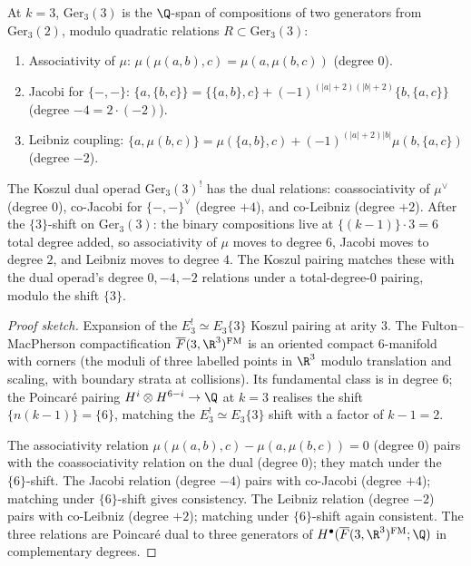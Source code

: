 \begin{proposition}
\label{prop:arity-3-e3-check-cfg2026}
\ClaimStatusProvedHere
At $k = 3$, $\mathrm{Ger}_3(3)$ is the $\Q$-span of compositions of two
generators from $\mathrm{Ger}_3(2)$, modulo quadratic relations
$R \subset \mathrm{Ger}_3(3)$:
\begin{enumerate}[label=\textup{(R\arabic*)}]
  \item Associativity of $\mu$: $\mu(\mu(a, b), c) = \mu(a, \mu(b, c))$
        (degree $0$).
  \item Jacobi for $\{-, -\}$:
        $\{a, \{b, c\}\} = \{\{a, b\}, c\} + (-1)^{(|a| + 2)(|b| + 2)} \{b, \{a, c\}\}$
        (degree $-4 = 2 \cdot (-2)$).
  \item Leibniz coupling: $\{a, \mu(b, c)\} = \mu(\{a, b\}, c) + (-1)^{(|a| + 2) |b|} \mu(b, \{a, c\})$
        (degree $-2$).
\end{enumerate}
The Koszul dual operad $\mathrm{Ger}_3(3)^!$ has the dual relations:
coassociativity of $\mu^\vee$ (degree $0$), co-Jacobi for
$\{-, -\}^\vee$ (degree $+4$), and co-Leibniz (degree $+2$). After the
$\{3\}$-shift on $\mathrm{Ger}_3(3)$: the binary compositions live at
$\{(k-1)\} \cdot 3 = 6$ total degree added, so associativity of $\mu$
moves to degree $6$, Jacobi moves to degree $2$, and Leibniz moves to
degree $4$. The Koszul pairing matches these with the dual operad's
degree $0, -4, -2$ relations under a total-degree-$0$ pairing, modulo
the shift $\{3\}$.
\end{proposition}

\begin{proof}[Proof sketch]
Expansion of the $E_3^! \simeq E_3\{3\}$ Koszul pairing at arity $3$.
The Fulton--MacPherson compactification $\overline{F}(3, \R^3)^{\mathrm{FM}}$
is an oriented compact $6$-manifold with corners (the moduli of three
labelled points in $\R^3$ modulo translation and scaling, with
boundary strata at collisions). Its fundamental class is in degree $6$;
the Poincar\'e pairing $H^i \otimes H^{6 - i} \to \Q$ at
$k = 3$ realises the shift $\{n (k - 1)\} = \{6\}$, matching the
$E_3^! \simeq E_3\{3\}$ shift with a factor of $k - 1 = 2$.

The associativity relation $\mu(\mu(a, b), c) - \mu(a, \mu(b, c)) = 0$
(degree $0$) pairs with the coassociativity relation on the dual
(degree $0$); they match under the $\{6\}$-shift. The Jacobi relation
(degree $-4$) pairs with co-Jacobi (degree $+4$); matching under
$\{6\}$-shift gives consistency. The Leibniz relation (degree $-2$)
pairs with co-Leibniz (degree $+2$); matching under $\{6\}$-shift again
consistent. The three relations are Poincar\'e dual to three generators
of $H^\bullet(\overline{F}(3, \R^3)^{\mathrm{FM}}; \Q)$ in
complementary degrees.
\end{proof}


